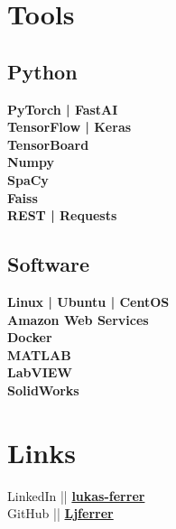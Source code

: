 \documentclass[letterpaper]{deedy-resume} %
\begin{document}
\begin{minipage}[t]{0.33\textwidth}
\sectionspace %


\section{Tools}

\subsection{Python}
{\bf PyTorch | FastAI} \\
{\bf TensorFlow | Keras} \\
{\bf TensorBoard} \\ 
{\bf Numpy} \\ 
{\bf SpaCy} \\ 
{\bf Faiss} \\ 
{\bf REST | Requests} \\

\sectionspace %

\subsection{Software}
{\bf Linux | Ubuntu | CentOS} \\
{\bf Amazon Web Services} \\
{\bf Docker} \\
{\bf MATLAB} \\
{\bf LabVIEW} \\
{\bf SolidWorks} \\

\sectionspace %


\section{Links} 
\location{}     %
{LinkedIn || \href{https://www.linkedin.com/in/lukas-ferrer-9596a410b}{\bf lukas-ferrer}} \\
{GitHub || \href{https://github.com/Ljferrer}{\bf Ljferrer}} \\


\sectionspace %


\end{minipage} %
\end{document}
